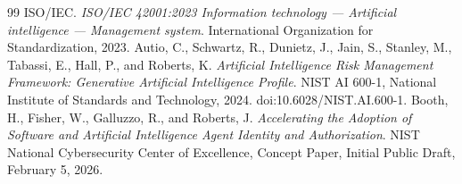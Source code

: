 \documentclass[11pt]{article}
\begin{document}
\begin{thebibliography}{99}
 ISO/IEC. \textit{ISO/IEC 42001:2023 Information technology --- Artificial intelligence --- Management system}. International Organization for Standardization, 2023.
 Autio, C., Schwartz, R., Dunietz, J., Jain, S., Stanley, M., Tabassi, E., Hall, P., and Roberts, K. \textit{Artificial Intelligence Risk Management Framework: Generative Artificial Intelligence Profile}. NIST AI 600-1, National Institute of Standards and Technology, 2024. doi:10.6028/NIST.AI.600-1.
Booth, H., Fisher, W., Galluzzo, R., and Roberts, J. \textit{Accelerating the Adoption of Software and Artificial Intelligence Agent Identity and Authorization}. NIST National Cybersecurity Center of Excellence, Concept Paper, Initial Public Draft, February 5, 2026.
\end{thebibliography}
\end{document}
